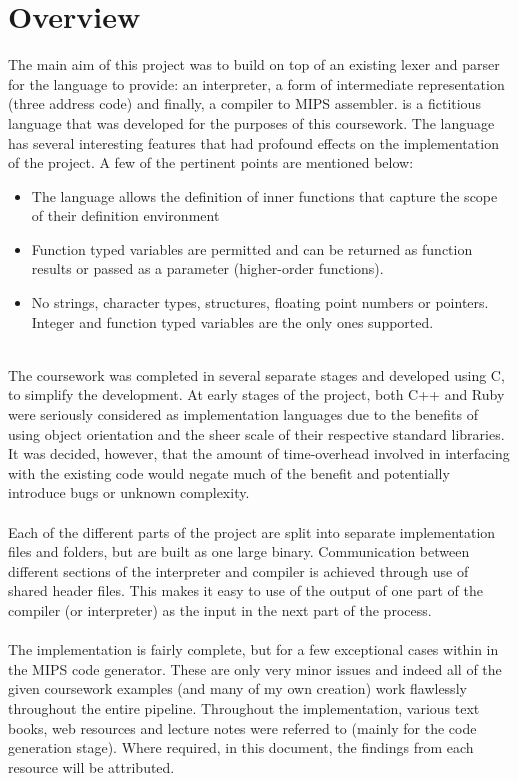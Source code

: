 \chapter{Overview}

The main aim of this project was to build on top of an existing lexer and parser for the \mmc language to provide: an interpreter, a form of intermediate representation (three address code) and finally, a compiler to MIPS assembler. \mmc is a fictitious language that was developed for the purposes of this coursework. The language has several interesting features that had profound effects on the implementation of the project. A few of the pertinent points are mentioned below:

\begin{itemize}
	\item The language allows the definition of inner functions that capture the scope of their definition environment
	\item Function typed variables are permitted and can be returned as function results or passed as a parameter (higher-order functions).
	\item No strings, character types, structures, floating point numbers or pointers. Integer and function typed variables are the only ones supported.
\end{itemize}
\vspace{-0.25cm}\ \\
The coursework was completed in several separate stages and developed using C, to simplify the development. At early stages of the project, both C++ and Ruby were seriously considered as implementation languages due to the benefits of using object orientation and the sheer scale of their respective standard libraries. It was decided, however, that the amount of time-overhead involved in interfacing with the existing code would negate much of the benefit and potentially introduce bugs or unknown complexity.
\ \\ \ \\
Each of the different parts of the project are split into separate implementation files and folders, but are built as one large binary. Communication between different sections of the interpreter and compiler is achieved through use of shared header files. This makes it easy to use of the output of one part of the compiler (or interpreter) as the input in the next part of the process.
\ \\ \ \\
The implementation is fairly complete, but for a few exceptional cases within in the MIPS code generator. These are only very minor issues and indeed all of the given coursework examples (and many of my own creation) work flawlessly throughout the entire pipeline. Throughout the implementation, various text books, web resources and lecture notes were referred to (mainly for the code generation stage). Where required, in this document, the findings from each resource will be attributed.

